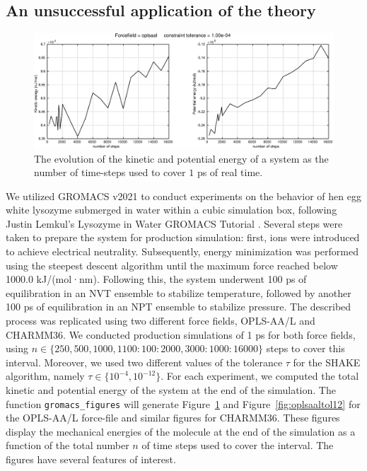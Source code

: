 \documentclass[runningheads]{llncs}
\begin{document}
\subsection{An unsuccessful application of the theory}

\begin{figure}
  \centering
  \includegraphics[width=\linewidth]{oplsaaltol04.pdf}
  \caption{The evolution of the kinetic and potential energy of a system as the number of time-steps used to cover $1$ ps of real time.} \label{fig:oplsaaltol04}
\end{figure}


We utilized GROMACS v2021 to conduct experiments on the behavior of hen egg white lysozyme submerged in water within a cubic simulation box, following Justin Lemkul's Lysozyme in Water GROMACS Tutorial \cite{lemkul2019from}. Several steps were taken to prepare the system for production simulation: first, ions were introduced to achieve electrical neutrality. Subsequently, energy minimization was performed using the steepest descent algorithm until the maximum force reached below 1000.0 kJ/(mol·nm). Following this, the system underwent 100 ps of equilibration in an NVT ensemble to stabilize temperature, followed by another 100 ps of equilibration in an NPT ensemble to stabilize pressure. The described process was replicated using two different force fields, OPLS-AA/L and CHARMM36. We conducted production simulations of 1 ps for both force fields, using $n \in \{250, 500, 1000, 1100:100:2000, 3000:1000:16000 \}$ steps to cover this interval.
Moreover, we used two different values of the tolerance $\tau$ for the SHAKE algorithm, namely $\tau \in \{10^{-4}, 10^{-12}\}$. 
For each experiment, we computed the total kinetic and potential energy of the system at the end of the simulation.
The function {\tt gromacs\_figures} will generate Figure~\ref{fig:oplsaaltol04} and Figure~\ref{fig:oplsaaltol12} for the OPLS-AA/L force-file and similar figures for CHARMM36. These figures display the mechanical energies of the molecule at the end of the simulation as a function of the total number $n$ of time steps used to cover the interval. The figures have several features of interest.
\end{document}
